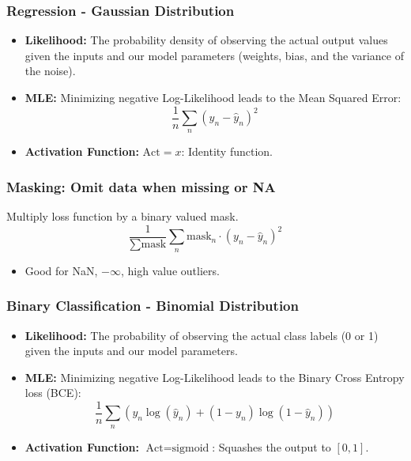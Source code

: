 \subsubsection{Regression - Gaussian Distribution}
\begin{notes}
    \begin{itemize}
        \item \textbf{Likelihood:} The probability density of observing the actual output values given the inputs and our model parameters (weights, bias, and the variance of the noise).
        \item \textbf{MLE:} Minimizing negative Log-Likelihood leads to the Mean Squared Error:
        \[
        \frac{1}{n} \sum_n (y_n - \hat{y}_n)^2
        \]
        \item \textbf{Activation Function:} $\text{Act} = x$: Identity function.
    \end{itemize}
\end{notes}

\subsubsection{Masking: Omit data when missing or NA}
\begin{notes}
    Multiply loss function by a binary valued mask. 
    \begin{equation*}
        \frac{1}{\sum \text{mask}} \sum_n \text{mask}_n \cdot (y_n - \hat{y}_n)^2
    \end{equation*}
    \begin{itemize}
        \item Good for NaN, $-\infty$, high value outliers.
    \end{itemize}
\end{notes}

\subsubsection{Binary Classification - Binomial Distribution}
\begin{notes}
    \begin{itemize}
        \item \textbf{Likelihood:} The probability of observing the actual class labels (0 or 1) given the inputs and our model parameters.
        \item \textbf{MLE:} Minimizing negative Log-Likelihood leads to the Binary Cross Entropy loss (BCE):
        \[
        \frac{1}{n} \sum_n \left( y_n \log(\hat{y}_n) + (1 - y_n) \log(1 - \hat{y}_n) \right)
        \]
        \item \textbf{Activation Function:} $\text{Act} = \text{sigmoid}$: Squashes the output to $[0, 1].$
    \end{itemize}
\end{notes}

